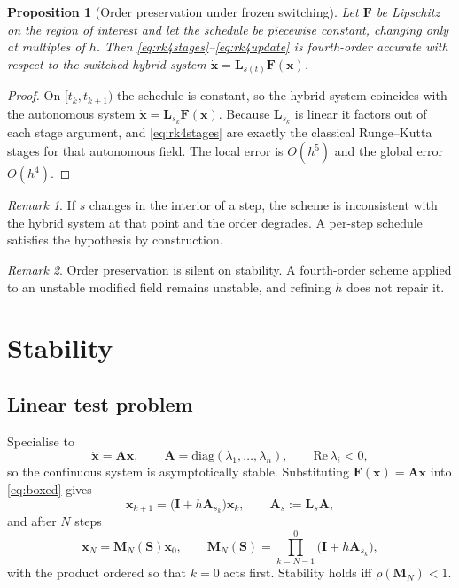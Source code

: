 \documentclass[12pt, a4paper]{article}
\theoremstyle{plain}
\newtheorem{proposition}{Proposition}
\theoremstyle{definition}
\theoremstyle{remark}
\newtheorem{remark}{Remark}
\newcommand{\bx}{\mathbf{x}}
\newcommand{\bF}{\mathbf{F}}
\newcommand{\bI}{\mathbf{I}}
\newcommand{\bA}{\mathbf{A}}
\newcommand{\bS}{\mathbf{S}}
\newcommand{\bM}{\mathbf{M}}
\newcommand{\bL}{\mathbf{L}}
\begin{document}
\begin{proposition}[Order preservation under frozen switching]
\label{prop:order}
Let $\bF$ be Lipschitz on the region of interest and let the schedule be
piecewise constant, changing only at multiples of $h$. Then
\eqref{eq:rk4stages}--\eqref{eq:rk4update} is fourth-order accurate with
respect to the switched hybrid system $\dot{\bx} = \bL_{s(t)}\bF(\bx)$.
\end{proposition}

\begin{proof}
On $[t_k,t_{k+1})$ the schedule is constant, so the hybrid system coincides
with the autonomous system $\dot{\bx} = \bL_{s_k}\bF(\bx)$. Because $\bL_{s_k}$
is linear it factors out of each stage argument, and
\eqref{eq:rk4stages} are exactly the classical Runge--Kutta stages for that
autonomous field. The local error is $O(h^5)$ and the global error $O(h^4)$.
\end{proof}

\begin{remark}
If $s$ changes in the interior of a step, the scheme is inconsistent with the
hybrid system at that point and the order degrades. A per-step schedule
satisfies the hypothesis by construction.
\end{remark}

\begin{remark}
Order preservation is silent on stability. A fourth-order scheme applied to an
unstable modified field remains unstable, and refining $h$ does not repair it.
\end{remark}

\section{Stability}
\label{sec:stability}

\subsection{Linear test problem}

Specialise to
\begin{equation}
\dot{\bx} = \bA\bx, \qquad \bA = \mathrm{diag}(\lambda_1,\dots,\lambda_n),
\qquad \mathrm{Re}\,\lambda_i < 0,
\label{eq:linear}
\end{equation}
so the continuous system is asymptotically stable. Substituting
$\bF(\bx) = \bA\bx$ into \eqref{eq:boxed} gives
\begin{equation}
\bx_{k+1} = \big(\bI + h\bA_{s_k}\big)\bx_k,
\qquad \bA_s := \bL_s\bA ,
\label{eq:linearstep}
\end{equation}
and after $N$ steps
\begin{equation}
\bx_N = \bM_N(\bS)\bx_0,
\qquad
\bM_N(\bS) = \prod_{k=N-1}^{0}\big(\bI + h\bA_{s_k}\big),
\label{eq:monodromy}
\end{equation}
with the product ordered so that $k=0$ acts first. Stability holds iff
$\rho(\bM_N) < 1$.
\end{document}
